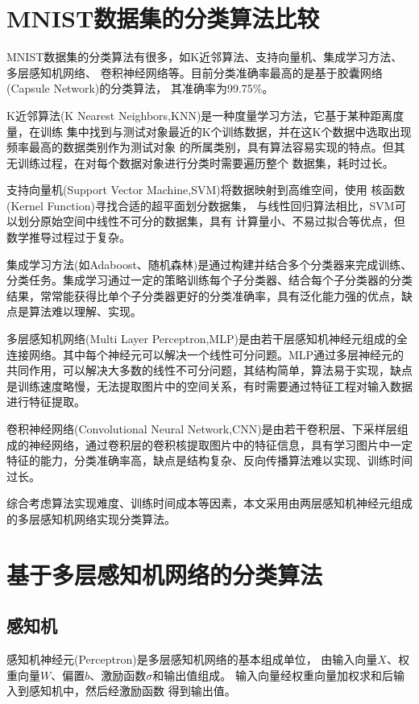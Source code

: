 \documentclass[forprint]{WHUBachelor}
\begin{document}
\chapter{MNIST数据集的分类算法比较}

  MNIST数据集的分类算法有很多，如K近邻算法、支持向量机、集成学习方法、多层感知机网络、
  卷积神经网络等。目前分类准确率最高的是基于胶囊网络(Capsule Network)的分类算法，
  其准确率为99.75\%。

  K近邻算法(K Nearest Neighbors,KNN)是一种度量学习方法，它基于某种距离度量，在训练
  集中找到与测试对象最近的K个训练数据，并在这K个数据中选取出现频率最高的数据类别作为测试对象
  的所属类别，具有算法容易实现的特点。但其无训练过程，在对每个数据对象进行分类时需要遍历整个
  数据集，耗时过长。

  支持向量机(Support Vector Machine,SVM)将数据映射到高维空间，使用
  核函数(Kernel Function)寻找合适的超平面划分数据集，
  与线性回归算法相比，SVM可以划分原始空间中线性不可分的数据集，具有
  计算量小、不易过拟合等优点，但数学推导过程过于复杂。

  集成学习方法(如Adaboost、随机森林)是通过构建并结合多个分类器来完成训练、分类任务。集成学习通过一定的策略训练每个子分类器、结合每个子分类器的分类结果，常常能获得比单个子分类器更好的分类准确率，具有泛化能力强的优点，缺点是算法难以理解、实现。

  多层感知机网络(Multi Layer Perceptron,MLP)是由若干层感知机神经元组成的全连接网络。其中每个神经元可以解决一个线性可分问题。MLP通过多层神经元的共同作用，可以解决大多数的线性不可分问题，其结构简单，算法易于实现，缺点是训练速度略慢，无法提取图片中的空间关系，有时需要通过特征工程对输入数据进行特征提取。

  卷积神经网络(Convolutional Neural Network,CNN)是由若干卷积层、下采样层组成的神经网络，通过卷积层的卷积核提取图片中的特征信息，具有学习图片中一定特征的能力，分类准确率高，缺点是结构复杂、反向传播算法难以实现、训练时间过长。

  综合考虑算法实现难度、训练时间成本等因素，本文采用由两层感知机神经元组成的多层感知机网络实现分类算法。



\chapter{基于多层感知机网络的分类算法}

  \section{感知机}
  感知机神经元(Perceptron)是多层感知机网络的基本组成单位，
  由输入向量$X$、权重向量$W$、偏置$b$、激励函数$\sigma$和输出值组成。
  输入向量经权重向量加权求和后输入到感知机中，然后经激励函数
  得到输出值。
\end{document}
